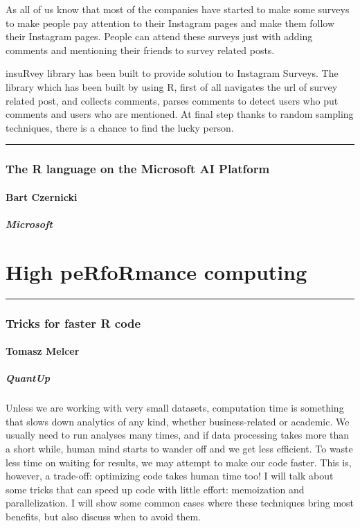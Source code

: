 \documentclass [12pt]{article}
\begin{document}
As all of us know that most of the companies have started to make some surveys to make people pay attention to their Instagram pages and make them follow their Instagram pages. People can attend these surveys just with adding comments and mentioning their friends to survey related posts.

insuRvey library has been built to provide solution to Instagram Surveys. The library which has been built by using R, first of all navigates the url of survey related post, and collects comments, parses comments to detect users who put comments and users who are mentioned. At final step thanks to random sampling techniques, there is a chance to find the lucky person.

\noindent\rule{\textwidth}{1pt}
\section{The R language on the Microsoft AI Platform}
\subsection*{Bart Czernicki}
\subsubsection*{Microsoft}
\newpage
{}
\part{High peRfoRmance computing}

\noindent\rule{\textwidth}{1pt}
\section{Tricks for faster R code}
\subsection*{Tomasz	Melcer}
\subsubsection*{QuantUp}

Unless we are working with very small datasets, computation time is something that slows down analytics of any kind, whether business-related or academic. We usually need to run analyses many times, and if data processing takes more than a short while, human mind starts to wander off and we get less efficient. To waste less time on waiting for results, we may attempt to make our code faster. This is, however, a trade-off: optimizing code takes human time too! I will talk about some tricks that can speed up code with little effort: memoization and parallelization. I will show some common cases where these techniques bring most benefits, but also discuss when to avoid them.
\end{document}
